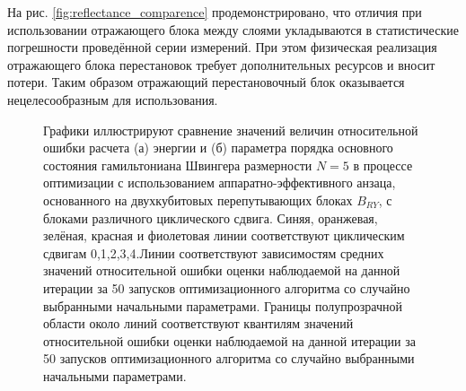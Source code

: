 \documentclass[14pt]{extarticle}
\begin{document}
\qquad На рис. \ref{fig:reflectance_comparence} продемонстрировано, что отличия при использовании отражающего блока между слоями укладываются в статистические погрешности проведённой серии измерений. При этом физическая реализация отражающего блока перестановок требует дополнительных ресурсов и вносит потери. Таким образом отражающий перестановочный блок оказывается нецелесообразным для использования.

\begin{figure}[H]
\begin{minipage}[H]{1.\linewidth}
\end{minipage}
\hfill
\begin{minipage}[H]{1.\linewidth}
\end{minipage}
\caption{Графики иллюстрируют сравнение значений величин относительной ошибки расчета (а) энергии и (б) параметра порядка основного состояния гамильтониана Швингера размерности $N = 5$ в процессе оптимизации с использованием аппаратно-эффективного анзаца, основанного на двухкубитовых перепутывающих блоках $B_{RY}$, с блоками различного циклического сдвига. Синяя, оранжевая, зелёная, красная и фиолетовая линии соответствуют циклическим сдвигам {0,1,2,3,4}.Линии соответствуют зависимостям средних значений относительной ошибки оценки наблюдаемой на данной итерации за 50 запусков оптимизационного алгоритма со случайно выбранными начальными параметрами. Границы полупрозрачной области около линий соответствуют квантилям значений относительной ошибки оценки наблюдаемой на данной итерации за 50 запусков оптимизационного алгоритма со случайно выбранными начальными параметрами.}\label{fig:shift_comparence}
\end{figure}
\end{document}
